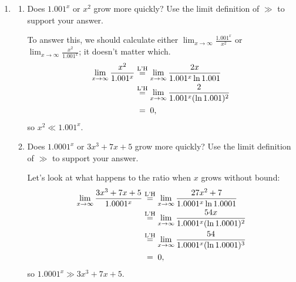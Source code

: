 \documentclass[main]{subfiles}
\begin{document}
\begin{enumerate}[resume]
\item 
  \begin{enumerate}
  \item
    \begin{problem}[\vfill]
      Does $1.001^x$ or $x^2$ grow more quickly?  Use the limit definition
      of $\gg$ to support your answer. 
    \end{problem}

    \begin{solution}
      To answer this, we should calculate either $\displaystyle \lim_{x
        \to \infty} \frac{1.001^x}{x^2}$ or $\displaystyle \lim_{x \to
        \infty} \frac{x^2}{1.001^x}$; it doesn't matter which.
      \begin{align*}
        \lim_{x \to \infty} \frac{x^2}{1.001^x} & \lheq \lim_{x \to
          \infty} \frac{2x}{1.001^x \ln 1.001} \\
        & \lheq \lim_{x \to
          \infty} \frac{2}{1.001^x (\ln 1.001)^2} \\
        & \nolheq 0,
      \end{align*}
      so $\boxed{x^2 \ll 1.001^x}$.
    \end{solution}

  \item


    \begin{problem}[\vfill]
      Does $1.0001^x$ or $3x^3 + 7x + 5$ grow more quickly?  Use the
      limit definition of $\gg$ to support your answer.
    \end{problem}

    \begin{solution}
      Let's look at what happens to the ratio when $x$ grows without
      bound:
      \begin{align*}
        \lim_{x \to \infty} \frac{3x^3 + 7x + 5}{1.0001^x} & \lheq
        \lim_{x \to \infty} \frac{27 x^2 + 7}{1.0001^x \ln 1.0001} \\
        & \lheq \lim_{x \to \infty} \frac{54 x}{1.0001^x (\ln 1.0001)^2}
        \\
        & \lheq \lim_{x \to \infty} \frac{54}{1.0001^x (\ln 1.0001)^3}
        \\
        & \nolheq 0,
      \end{align*}
      so $\boxed{1.0001^x \gg 3x^3 + 7x + 5}$. 
    \end{solution}


\end{enumerate}
\end{enumerate}
\end{document}
